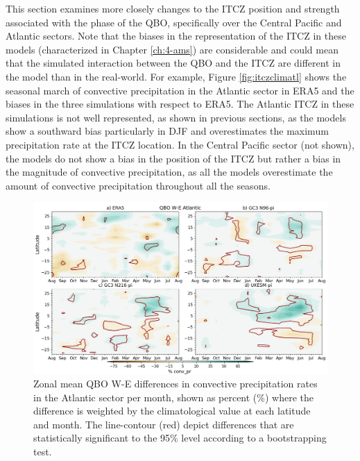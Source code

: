 This section examines more closely changes to the ITCZ position and strength associated with the phase of the QBO, specifically over the Central Pacific and Atlantic sectors. 
Note that the biases in the representation of the ITCZ in these models (characterized in Chapter \ref{ch:4-ams}) are considerable and could mean that the simulated interaction between the QBO and the ITCZ are different in the model than in the real-world. 
For example, Figure \ref{fig:itczclimatl} shows the seasonal march of convective precipitation in the Atlantic sector in ERA5 and the biases in the three simulations with respect to ERA5. The Atlantic ITCZ in these simulations is not well represented, as shown in previous sections, as the models show a southward bias particularly in DJF and overestimates the maximum precipitation rate at the ITCZ location. In the Central Pacific sector (not shown), the models do not show a bias in the position of the ITCZ but rather a bias in the magnitude of convective precipitation, as all the models overestimate the amount of convective precipitation throughout all the seasons. 
 


\begin{figure}[t!]
\centering
 \includegraphics[width=\linewidth]{figures/anomcmip_conv_pratlqbow.png}
\caption[Atlantic ITCZ convective precipitation differences on QBO phase.]{ Zonal mean QBO W-E differences in convective precipitation rates in the Atlantic sector per month, shown as percent (\%) where the difference is weighted by the climatological value at each latitude  and month. The line-contour (red) depict differences that are statistically significant to the 95\% level according to a bootstrapping test. }
\label{fig:itczqbowatl}
\end{figure}


